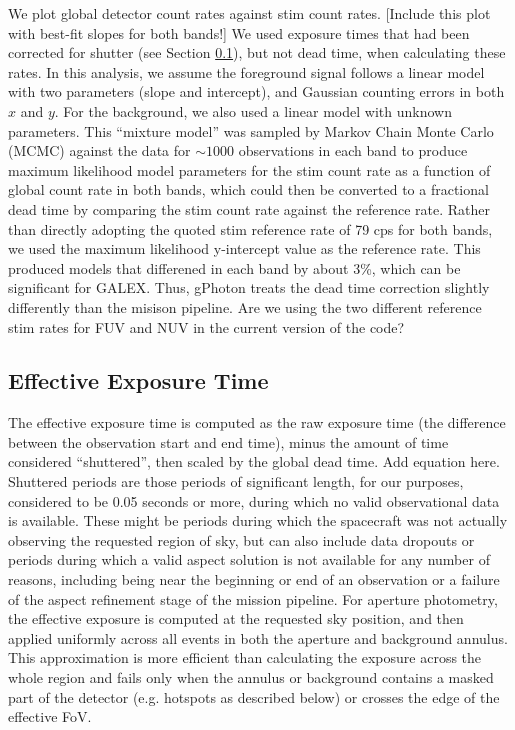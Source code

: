 \documentclass[5p]{elsarticle}
\begin{document}
We plot global detector count rates against stim count rates. {\color{red}[Include this plot with best-fit slopes for both bands!]} We used exposure times that had been corrected for shutter (see Section \ref{effexptime}), but not dead time, when calculating these rates. In this analysis, we assume the foreground signal follows a linear model with two parameters (slope and intercept), and Gaussian counting errors in both $x$ and $y$. For the background, we also used a linear model with unknown parameters. This ``mixture model'' was sampled by Markov Chain Monte Carlo (MCMC) against the data for $\sim 1000$ observations in each band to produce maximum likelihood model parameters for the stim count rate as a function of global count rate in both bands, which could then be converted to a fractional dead time by comparing the stim count rate against the reference rate. Rather than directly adopting the quoted stim reference rate of 79 cps for both bands, we used the maximum likelihood y-intercept value as the reference rate. This produced models that differened in each band by about 3\%, which can be significant for GALEX.  Thus, gPhoton treats the dead time correction slightly differently than the misison pipeline.  {\color{red}Are we using the two different reference stim rates for FUV and NUV in the current version of the code?}

\subsection{Effective Exposure Time}
\label{effexptime}
The effective exposure time is computed as the raw exposure time (the difference between the observation start and end time), minus the amount of time considered ``shuttered'', then scaled by the global dead time.  {\color{red}Add equation here.} Shuttered periods are those periods of significant length, for our purposes, considered to be 0.05 seconds or more, during which no valid observational data is available. These might be periods during which the spacecraft was not actually observing the requested region of sky, but can also include data dropouts or periods during which a valid aspect solution is not available for any number of reasons, including being near the beginning or end of an observation or a failure of the aspect refinement stage of the mission pipeline.  For aperture photometry, the effective exposure is computed at the requested sky position, and then applied uniformly across all events in both the aperture and background annulus. This approximation is more efficient than calculating the exposure across the whole region and fails only when the annulus or background contains a masked part of the detector (e.g. hotspots as described below) or crosses the edge of the effective FoV.
\end{document}
